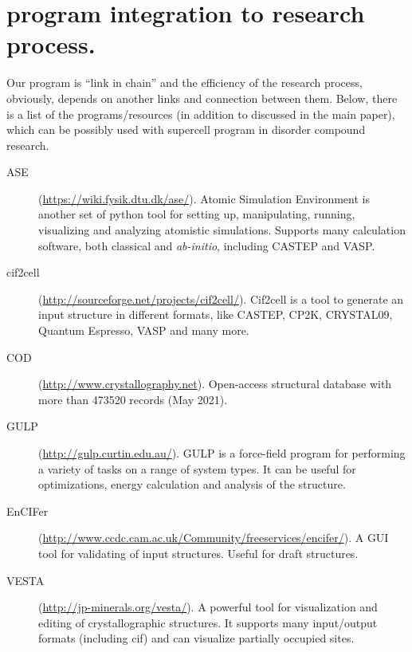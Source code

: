 \documentclass[a4paper,10pt]{article}
\begin{document}
\section*{\Sups{} program integration to research process.}
Our program is ``link in chain'' and the efficiency of the research process, obviously, depends on another links and connection between them. Below, there is a list of the programs/resources (in addition to discussed in the main paper), which can be possibly used with supercell program in disorder compound research.
\begin{description}
  \item[ASE] (\url{https://wiki.fysik.dtu.dk/ase/}). Atomic Simulation Environment is another set of python tool for setting up, manipulating, running, visualizing and analyzing atomistic simulations. Supports many calculation software, both classical and \textit{ab-initio}, including CASTEP and VASP. 
  \item[cif2cell] (\url{http://sourceforge.net/projects/cif2cell/}). Cif2cell is a tool to generate an input structure in different formats, like CASTEP, CP2K, CRYSTAL09, Quantum Espresso, VASP and many more. 
  \item[COD] (\url{http://www.crystallography.net}). Open-access  structural database with more than \num{473520} records (May 2021). 
  \item[GULP] (\url{http://gulp.curtin.edu.au/}). GULP is a force-field program for performing a variety of tasks on a range of system types. It can be useful for optimizations, energy calculation and analysis of the structure.
  \item[EnCIFer] (\url{http://www.ccdc.cam.ac.uk/Community/freeservices/encifer/}). A GUI tool for validating of \sups{} input structures. Useful for draft structures.
  \item[VESTA] (\url{http://jp-minerals.org/vesta/}). A powerful tool for visualization and editing of crystallographic structures. It supports many input/output formats (including cif) and can visualize partially occupied sites.
\end{description}

 
\end{document}
